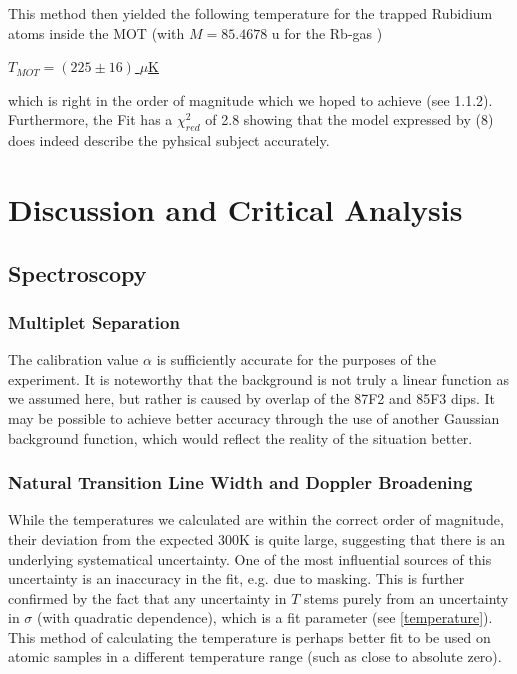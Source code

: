 \documentclass[12pt, a4paper]{article}
\begin{document}
\bigskip
This method then yielded the following temperature for the trapped Rubidium atoms inside the MOT (with $M=85.4678$ u for the Rb-gas \cite{Rbmass})

\bigskip
\underline{$T_{MOT}= (225 \pm 16)$ $\mu$K}

\bigskip
which is right in the order of magnitude which we hoped to achieve (see 1.1.2).
Furthermore, the Fit has a $\chi^2_{red}$ of 2.8 showing that the model expressed by (8) does indeed describe the pyhsical subject accurately.































\newpage

\section{Discussion and Critical Analysis}

\subsection{Spectroscopy}
\subsubsection{Multiplet Separation}
The calibration value $\alpha$ is sufficiently accurate for the purposes of the experiment. It is noteworthy that the background is not truly a linear function as we assumed here, but rather is caused by overlap of the 87F2 and 85F3 dips. It may be possible to achieve better accuracy through the use of another Gaussian background function, which would reflect the reality of the situation better.

\subsubsection{Natural Transition Line Width and Doppler Broadening}
While the temperatures we calculated are within the correct order of magnitude, their deviation from the expected $300\si{\kelvin}$ is quite large, suggesting that there is an underlying systematical uncertainty. One of the most influential sources of this uncertainty is an inaccuracy in the fit, e.g. due to masking. This is further confirmed by the fact that any uncertainty in $T$ stems purely from an uncertainty in $\sigma$ (with quadratic dependence), which is a fit parameter (see \autoref{temperature}). This method of calculating the temperature is perhaps better fit to be used on atomic samples in a different temperature range (such as close to absolute zero).
\end{document}
